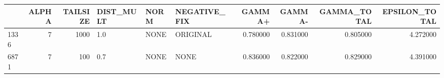 \begin{tabular}{lrrlllrrrr}
\toprule
 & ALPHA & TAILSIZE & DIST_MULT & NORM & NEGATIVE_FIX & GAMMA+ & GAMMA- & GAMMA_TOTAL & EPSILON_TOTAL \\
\midrule
1336 & 7 & 1000 & 1.0 & NONE & ORIGINAL & 0.780000 & 0.831000 & 0.805000 & 4.272000 \\
6871 & 7 & 100 & 0.7 & NONE & NONE & 0.836000 & 0.822000 & 0.829000 & 4.391000 \\
\bottomrule
\end{tabular}

